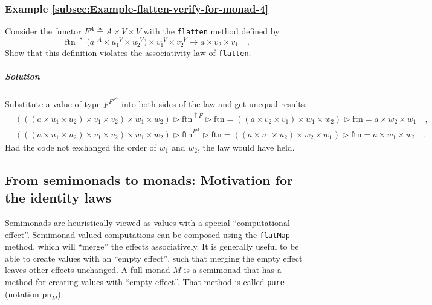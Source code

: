 \subsubsection{Example \label{subsec:Example-flatten-verify-for-monad-4}\ref{subsec:Example-flatten-verify-for-monad-4}}

Consider the functor $F^{A}\triangleq A\times V\times V$ with the
\lstinline!flatten! method defined by
\[
\text{ftn}\triangleq\big(a^{:A}\times u_{1}^{:V}\times u_{2}^{:V}\big)\times v_{1}^{:V}\times v_{2}^{:V}\rightarrow a\times v_{2}\times v_{1}\quad.
\]
Show that this definition violates the associativity law of \lstinline!flatten!.

\subparagraph{Solution}

Substitute a value of type $F^{F^{F^{A}}}$ into both sides of the
law and get unequal results:
\begin{align*}
 & \left(\left(\left(a\times u_{1}\times u_{2}\right)\times v_{1}\times v_{2}\right)\times w_{1}\times w_{2}\right)\triangleright\text{ftn}^{\uparrow F}\triangleright\text{ftn}=\left(\left(a\times v_{2}\times v_{1}\right)\times w_{1}\times w_{2}\right)\triangleright\text{ftn}=a\times w_{2}\times w_{1}\quad,\\
 & \left(\left(\left(a\times u_{1}\times u_{2}\right)\times v_{1}\times v_{2}\right)\times w_{1}\times w_{2}\right)\triangleright\text{ftn}^{F^{A}}\triangleright\text{ftn}=\left(\left(a\times u_{1}\times u_{2}\right)\times w_{2}\times w_{1}\right)\triangleright\text{ftn}=a\times w_{1}\times w_{2}\quad.
\end{align*}
Had the code not exchanged the order of $w_{1}$ and $w_{2}$, the
law would have held.

\subsection{From semimonads to monads: Motivation for the identity laws}

Semimonads are heuristically viewed as values with a special \textsf{``}computational
effect\textsf{''}. Semimonad-valued computations can be composed using the
\lstinline!flatMap! method, which will \textsf{``}merge\textsf{''} the effects associatively.
It is generally useful to be able to create values with an \textsf{``}empty
effect\textsf{''}, such that merging the empty effect leaves other effects
unchanged. A full monad $M$ is a semimonad that has a method for
creating values with \textsf{``}empty effect\textsf{''}. That method is called \lstinline!pure!
(notation $\text{pu}_{M}$):

